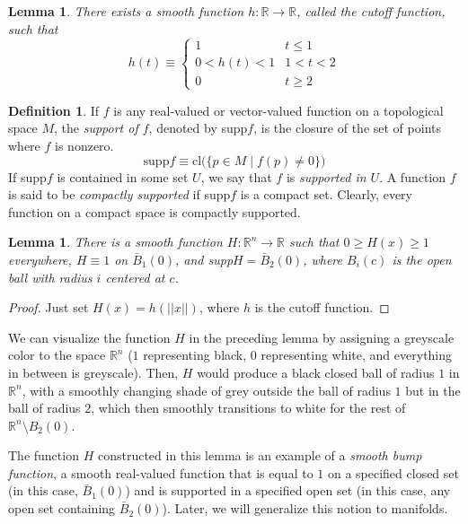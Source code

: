 \documentclass{article}
\newtheorem{lemma}[theorem]{Lemma}
\theoremstyle{remark}
\theoremstyle{definition}
\newtheorem{definition}{Definition}[section]
\begin{document}
\begin{lemma}
There exists a smooth function $h: \mathbb{R} \longrightarrow \mathbb{R}$, called the \textit{cutoff function}, such that 
\[h(t) \equiv \begin{cases}
      1 & t \leq 1 \\
      0 < h(t) < 1 & 1 < t < 2 \\
      0 & t \geq 2
\end{cases}\]
\end{lemma}

\begin{definition}
If $f$ is any real-valued or vector-valued function on a topological space $M$, the \textit{support of $f$}, denoted by supp$f$, is the closure of the set of points where $f$ is nonzero. 
\[\text{supp} f \equiv \text{cl} \big(\{p \in M\;|\; f(p) \neq 0\}\big)\]
If supp$f$ is contained in some set $U$, we say that $f$ is \textit{supported in $U$}. A function $f$ is said to be \textit{compactly supported} if supp$f$ is a compact set. Clearly, every function on a compact space is compactly supported. 
\end{definition}

\begin{lemma}
There is a smooth function $H: \mathbb{R}^n \longrightarrow \mathbb{R}$ such that $0 \geq H(x) \geq 1$ everywhere, $H \equiv 1$ on $\bar{B}_1 (0)$, and supp$H = \bar{B}_2 (0)$, where $B_i (c)$ is the open ball with radius $i$ centered at $c$. 
\end{lemma}
\begin{proof}
Just set $H(x) = h(||x||)$,  where $h$ is the cutoff function. 
\end{proof}

We can visualize the function $H$ in the preceding lemma by assigning a greyscale color to the space $\mathbb{R}^n$ ($1$ representing black, $0$ representing white, and everything in between is greyscale). Then, $H$ would produce a black closed ball of radius $1$ in $\mathbb{R}^n$, with a smoothly changing shade of grey outside the ball of radius $1$ but in the ball of radius $2$, which then smoothly transitions to white for the rest of $\mathbb{R}^n \setminus B_2 (0)$. 

The function $H$ constructed in this lemma is an example of a \textit{smooth bump function}, a smooth real-valued function that is equal to $1$ on a specified closed set (in this case, $\bar{B}_1 (0)$) and is supported in a specified open set (in this case, any open set containing $\bar{B}_2 (0)$). Later, we will generalize this notion to manifolds. 
\end{document}
